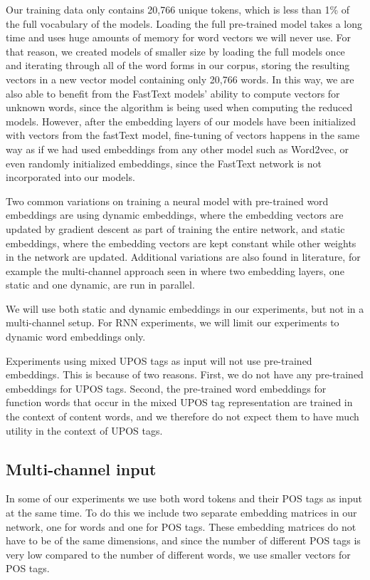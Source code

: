 Our training data only contains 20,766 unique tokens, which is less than 1\%
of the full vocabulary of the models. Loading the full pre-trained model
takes a long time and uses huge amounts of memory for word vectors we will
never use. For that reason, we created models of smaller size by loading the
full models once and iterating through all of the word forms in our corpus,
storing the resulting vectors in a new vector model containing only 20,766
words. In this way, we are also able to benefit from the FastText models'
ability to compute vectors for unknown words, since the \ngram algorithm is
being used when computing the reduced models. However, after the embedding
layers of our models have been initialized with vectors from the fastText
model, fine-tuning of vectors happens in the same way as if we had used
embeddings from any other model such as Word2vec, or even randomly
initialized embeddings, since the FastText network is not incorporated into
our models.

Two common variations on training a neural model with pre-trained word
embeddings are using dynamic embeddings, where the embedding vectors are
updated by gradient descent as part of training the entire network, and
static embeddings, where the embedding vectors are kept constant while other
weights in the network are updated. Additional variations are also found in
literature, for example the multi-channel approach seen in
\textcite{kim2014convolutional} where two embedding layers, one static and
one dynamic, are run in parallel.

We will use both static and dynamic embeddings in our experiments, but not in
a multi-channel setup. For RNN experiments, we will limit our experiments to
dynamic word embeddings only.

Experiments using mixed UPOS tags as input will not use pre-trained
embeddings. This is because of two reasons. First, we do not have any
pre-trained embeddings for UPOS tags. Second, the pre-trained word embeddings
for function words that occur in the mixed UPOS tag representation are
trained in the context of content words, and we therefore do not expect them
to have much utility in the context of UPOS tags.


\subsection{Multi-channel input}

In some of our experiments we use both word tokens and their POS tags as
input at the same time. To do this we include two separate embedding matrices
in our network, one for words and one for POS tags. These embedding matrices
do not have to be of the same dimensions, and since the number of different
POS tags is very low compared to the number of different words, we use
smaller vectors for POS tags.

